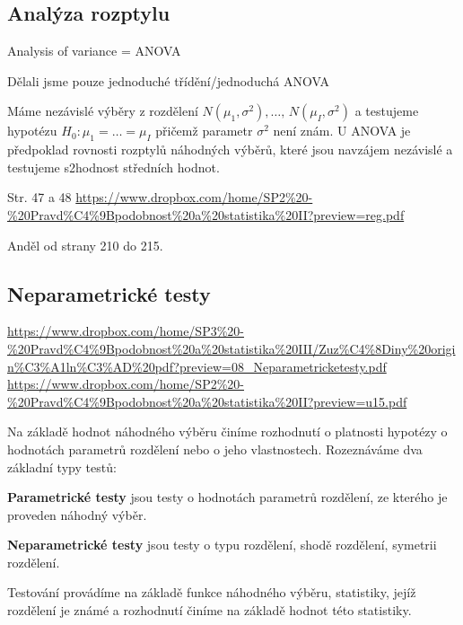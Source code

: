 \subsection{Analýza rozptylu}

Analysis of variance = ANOVA

Dělali jsme pouze jednoduché třídění/jednoduchá ANOVA

Máme nezávislé výběry z rozdělení $N\left(\mu_1,\sigma^2\right),\ldots,\,N\left(\mu_I,\sigma^2\right)$ a testujeme hypotézu $H_0:\mu_1=\ldots=\mu_I$ přičemž parametr $\sigma^2$ není znám. U ANOVA je předpoklad rovnosti rozptylů náhodných výběrů, které jsou navzájem nezávislé a testujeme s2hodnost středních hodnot. 

Str. 47 a 48
\url{https://www.dropbox.com/home/SP2\%20-\%20Pravd\%C4\%9Bpodobnost\%20a\%20statistika\%20II?preview=reg.pdf}

Anděl od strany 210 do 215. 

\subsection{Neparametrické testy}
\url{https://www.dropbox.com/home/SP3\%20-\%20Pravd\%C4\%9Bpodobnost\%20a\%20statistika\%20III/Zuz\%C4\%8Diny\%20origin\%C3\%A1ln\%C3\%AD\%20pdf?preview=08_Neparametricketesty.pdf}
\url{https://www.dropbox.com/home/SP2\%20-\%20Pravd\%C4\%9Bpodobnost\%20a\%20statistika\%20II?preview=u15.pdf}

Na základě hodnot náhodného výběru činíme rozhodnutí o platnosti hypotézy o hodnotách parametrů rozdělení nebo o jeho vlastnostech. Rozeznáváme dva základní typy testů:

\textbf{Parametrické testy} jsou testy o hodnotách parametrů rozdělení, ze kterého je proveden náhodný výběr.

\textbf{Neparametrické testy} jsou testy o typu rozdělení, shodě rozdělení, symetrii rozdělení.

Testování provádíme na základě funkce náhodného výběru, statistiky, jejíž rozdělení je známé a rozhodnutí činíme na základě hodnot této statistiky.

